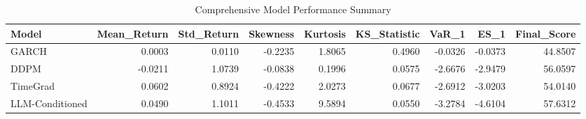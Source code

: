 \begin{table}
\caption{Comprehensive Model Performance Summary}
\label{tab:model_summary}
\begin{tabular}{lrrrrrrrr}
\toprule
Model & Mean_Return & Std_Return & Skewness & Kurtosis & KS_Statistic & VaR_1 & ES_1 & Final_Score \\
\midrule
GARCH & 0.0003 & 0.0110 & -0.2235 & 1.8065 & 0.4960 & -0.0326 & -0.0373 & 44.8507 \\
DDPM & -0.0211 & 1.0739 & -0.0838 & 0.1996 & 0.0575 & -2.6676 & -2.9479 & 56.0597 \\
TimeGrad & 0.0602 & 0.8924 & -0.4222 & 2.0273 & 0.0677 & -2.6912 & -3.0203 & 54.0140 \\
LLM-Conditioned & 0.0490 & 1.1011 & -0.4533 & 9.5894 & 0.0550 & -3.2784 & -4.6104 & 57.6312 \\
\bottomrule
\end{tabular}
\end{table}
